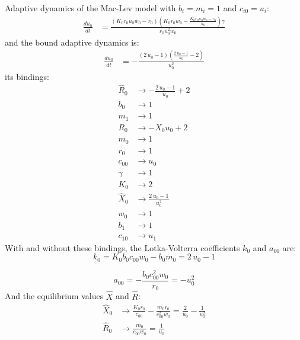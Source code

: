\documentclass{article}
\begin{document}
Adaptive dynamics of the Mac-Lev model with $b_i=m_i=1$ and $c_{i0} = u_i$:
\[\begin{align*}
\frac{du_{0}}{dt} &= \frac{{\left(K_{0} r_{0} u_{0} w_{0} - r_{0}\right)} {\left(K_{0} r_{0} w_{0} - \frac{K_{0} r_{0} u_{0} w_{0} - r_{0}}{u_{0}}\right)} \gamma}{r_{0} u_{0}^{2} w_{0}}
\end{align*}\]
and the bound adaptive dynamics is:\begin{align*}
\frac{du_{0}}{dt} &= -\frac{{\left(2 \, u_{0} - 1\right)} {\left(\frac{2 \, u_{0} - 1}{u_{0}} - 2\right)}}{u_{0}^{2}}
\end{align*}its bindings:\begin{align*}
  \hat{R}_{0} &\to -\frac{2 \, u_{0} - 1}{u_{0}} + 2 \\
  b_{0} &\to 1 \\
  m_{1} &\to 1 \\
  R_{0} &\to -X_{0} u_{0} + 2 \\
  m_{0} &\to 1 \\
  r_{0} &\to 1 \\
  c_{00} &\to u_{0} \\
  \gamma &\to 1 \\
  K_{0} &\to 2 \\
  \hat{X}_{0} &\to \frac{2 \, u_{0} - 1}{u_{0}^{2}} \\
  w_{0} &\to 1 \\
  b_{1} &\to 1 \\
  c_{10} &\to u_{1}
\end{align*}With and without these bindings, the Lotka-Volterra coefficients $k_0$ and $a_{00}$ are:
\[
  k_{0} = K_{0} b_{0} c_{00} w_{0} - b_{0} m_{0} = 2 \, u_{0} - 1
\]

\[
  a_{00} = -\frac{b_{0} c_{00}^{2} w_{0}}{r_{0}} = -u_{0}^{2}
\]
And the equilibrium values $\hat X$ and $\hat R$:\begin{align*}
  \hat X_0 &\to \frac{K_{0} r_{0}}{c_{00}} - \frac{m_{0} r_{0}}{c_{00}^{2} w_{0}} = \frac{2}{u_{0}} - \frac{1}{u_{0}^{2}}\\
  \hat R_0 &\to \frac{m_{0}}{c_{00} w_{0}} = \frac{1}{u_{0}}
\end{align*}
\end{document}
